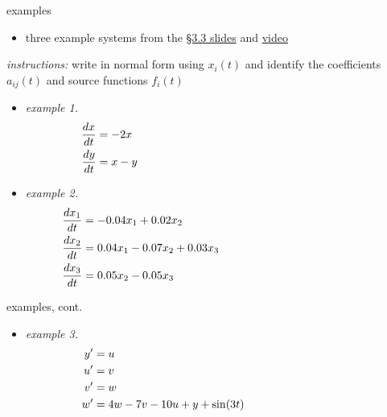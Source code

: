 \documentclass[urlcolor=blue,dvipsnames]{beamer}
\begin{document}
\begin{frame}{examples}

\small
\begin{itemize}
\item three example systems from the \href{https://bueler.github.io/math302/assets/slides/3-3.pdf}{\S3.3 slides} and \href{https://drive.explaineverything.com/thecode/XAAUNGS}{video}
\end{itemize}


\noindent \emph{instructions:} write in normal form using $x_i(t)$ and identify the coefficients $a_{ij}(t)$ and source functions $f_i(t)$

\begin{itemize}
\item \emph{example 1.}
\begin{align*}
\frac{dx}{dt} &= - 2 x \hspace{70mm} \\
\frac{dy}{dt} &= x - y
\end{align*}
\item \emph{example 2.}
\begin{align*}
\frac{dx_1}{dt} &= -0.04 x_1 + 0.02 x_2 \hspace{60mm} \\
\frac{dx_2}{dt} &= 0.04 x_1 - 0.07 x_2 + 0.03 x_3 \\
\frac{dx_3}{dt} &= 0.05 x_2 - 0.05 x_3
\end{align*}
\end{itemize}
\end{frame}


\begin{frame}{examples, cont.}

\small
\begin{itemize}
\item \emph{example 3.}
\begin{align*}
y' &= u \hspace{75mm} \\
u' &= v \\
v' &= w \\
w' &= 4w-7v-10u+y+\sin(3t)
\end{align*}
\end{itemize}

\vspace{40mm}
\end{frame}
\end{document}
